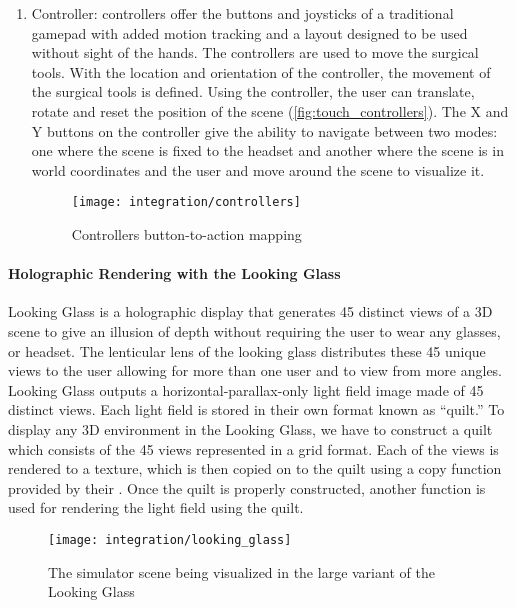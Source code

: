 \begin{enumerate}
  \item Controller:
   controllers offer the buttons and joysticks of a traditional gamepad with added motion tracking and a layout designed to be used without sight of the hands. The controllers are used to move the surgical tools. With the location and orientation of the controller, the movement of the surgical tools is defined. Using the controller, the user can translate, rotate and reset the position of the scene (\autoref{fig:touch_controllers}). The \textsf{X} and \textsf{Y} buttons on the controller give the ability to navigate between two modes: one where the scene is fixed to the headset and another where the scene is in world coordinates and the user and move around the scene to visualize it.

  \begin{figure}
    \centering
    \texttt{[image: integration/controllers]}
    \caption{Controllers button-to-action mapping}
    \label{fig:touch_controllers}
  \end{figure}
\end{enumerate}

\paragraph{Holographic Rendering with the Looking Glass}
Looking Glass is a holographic display that generates 45 distinct views of a 3D scene to give an illusion of depth without requiring the user to wear any glasses, or headset. The lenticular lens of the looking glass distributes these 45 unique views to the user allowing for more than one user and to view from more angles.
Looking Glass outputs a horizontal-parallax-only light field image made of 45 distinct views. Each light field is stored in their own format known as \enquote{quilt.} To display any 3D environment in the Looking Glass, we have to construct a quilt which consists of the 45 views represented in a grid format. Each of the views is rendered to a texture, which is then copied on to the quilt using a copy function provided by their . Once the quilt is properly constructed, another  function is used for rendering the light field using the quilt.

\begin{figure}
  \centering
  \texttt{[image: integration/looking\_glass]}
  \caption{The simulator scene being visualized in the large variant of the Looking Glass}
  \label{fig:looking_glass}
\end{figure}


